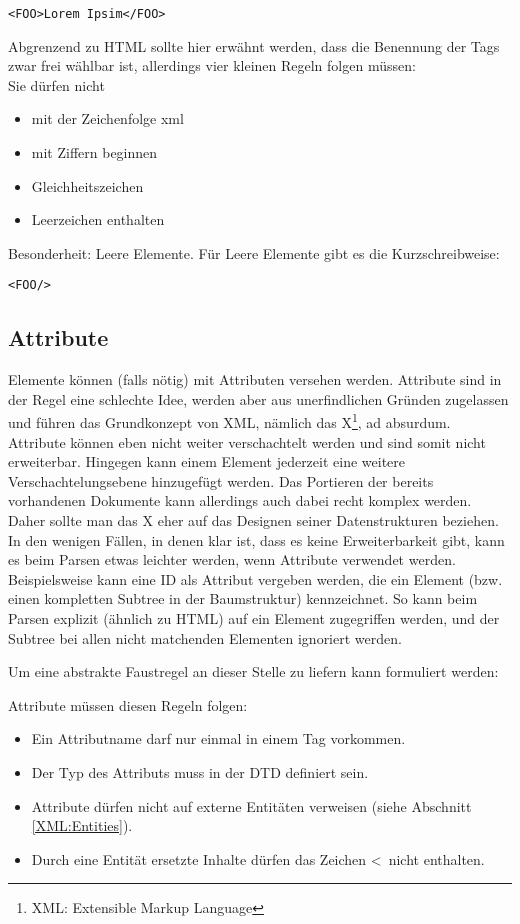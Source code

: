 \begin{verbatim}
<FOO>Lorem Ipsim</FOO>
\end{verbatim}

Abgrenzend zu HTML sollte hier erwähnt werden, dass die Benennung der Tags zwar frei wählbar ist, allerdings vier
kleinen Regeln folgen müssen: \\
Sie dürfen nicht
\begin{itemize}
    \item mit der Zeichenfolge xml 
    \item mit Ziffern beginnen
    \item Gleichheitszeichen 
    \item Leerzeichen enthalten
\end{itemize}

Besonderheit: Leere Elemente. Für Leere Elemente gibt es die Kurzschreibweise:
 \begin{verbatim}
<FOO/>
\end{verbatim}
 
\subsection{Attribute}
Elemente können (falls nötig) mit Attributen versehen werden. Attribute sind in der Regel eine schlechte Idee, werden
aber aus unerfindlichen Gründen zugelassen und führen das Grundkonzept von XML, nämlich das X\footnote{XML: Extensible
Markup Language}, ad absurdum. Attribute können eben nicht weiter verschachtelt werden und sind somit nicht
erweiterbar. Hingegen kann einem Element jederzeit eine weitere Verschachtelungsebene hinzugefügt werden. Das Portieren
der bereits vorhandenen Dokumente kann allerdings auch dabei recht komplex werden. Daher sollte man das X eher auf das
Designen seiner Datenstrukturen beziehen. In den wenigen Fällen, in denen klar ist, dass es keine Erweiterbarkeit gibt,
kann es beim Parsen etwas leichter werden, wenn Attribute verwendet werden. Beispielsweise kann eine ID als Attribut
vergeben werden, die ein Element (bzw. einen kompletten Subtree in der Baumstruktur) kennzeichnet. So kann beim Parsen
explizit (ähnlich zu HTML) auf ein Element zugegriffen werden, und der Subtree bei allen nicht matchenden Elementen
ignoriert werden.

Um eine abstrakte Faustregel an dieser Stelle zu liefern kann formuliert werden:

Attribute müssen diesen Regeln folgen:
\begin{itemize}
    \item Ein Attributname darf nur einmal in einem Tag vorkommen.
    \item Der Typ des Attributs muss in der DTD definiert sein.
    \item Attribute dürfen nicht auf externe Entitäten verweisen (siehe Abschnitt \ref{XML:Entities}).
    \item Durch eine Entität ersetzte Inhalte dürfen das Zeichen \textless\ nicht enthalten.
\end{itemize}


